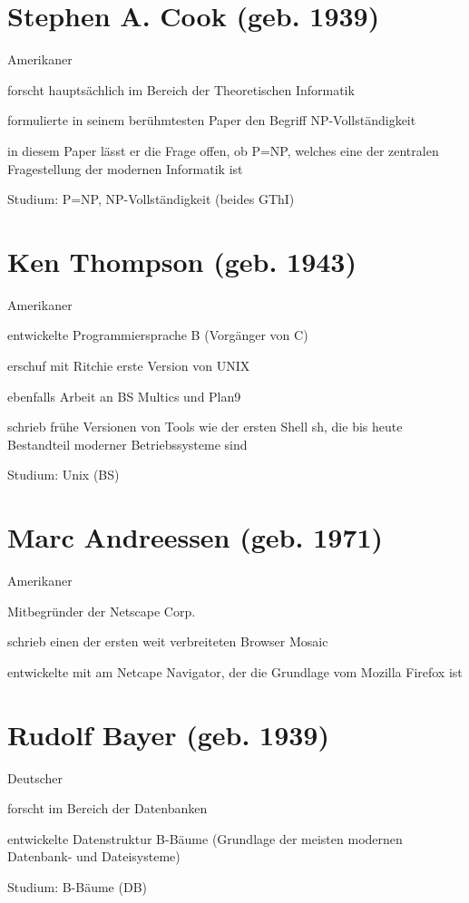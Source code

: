 \documentclass[a4paper,12pt]{report}
\begin{document}
\section{Stephen A. Cook (geb. 1939)}
\begin{itemize*}
	\item Amerikaner
	\item forscht hauptsächlich im Bereich der Theoretischen Informatik
	\item formulierte in seinem berühmtesten Paper den Begriff NP-Vollständigkeit
	\item in diesem Paper lässt er die Frage offen, ob P=NP, welches eine der zentralen Fragestellung der modernen Informatik ist
	\item Studium: P=NP, NP-Vollständigkeit (beides GThI)
\end{itemize*}

\section{Ken Thompson (geb. 1943)}
\begin{itemize*}
	\item Amerikaner
	\item entwickelte Programmiersprache B (Vorgänger von C)
	\item erschuf mit Ritchie erste Version von UNIX
	\item ebenfalls Arbeit an BS Multics und Plan9
	\item schrieb frühe Versionen von Tools wie der ersten Shell sh, die bis heute Bestandteil moderner Betriebssysteme sind
	\item Studium: Unix (BS)
\end{itemize*}

\section{Marc Andreessen (geb. 1971)}
\begin{itemize*}
	\item Amerikaner
	\item Mitbegründer der Netscape Corp.
	\item schrieb einen der ersten weit verbreiteten Browser Mosaic
	\item entwickelte mit am Netcape Navigator, der die Grundlage vom Mozilla Firefox ist
\end{itemize*}

\section{Rudolf Bayer (geb. 1939)}
\begin{itemize*}
	\item Deutscher
	\item forscht im Bereich der Datenbanken
	\item entwickelte Datenstruktur B-Bäume (Grundlage der meisten modernen Datenbank- und Dateisysteme)
	\item Studium: B-Bäume (DB)
\end{itemize*}
\end{document}
